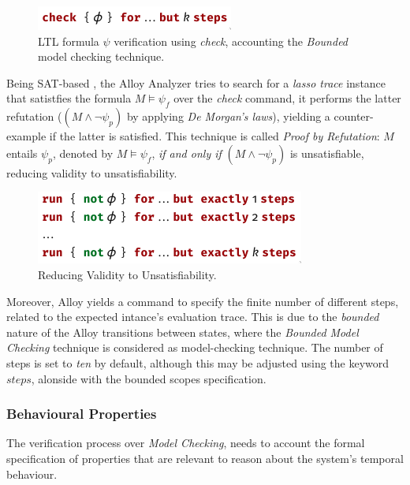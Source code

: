 \begin{figure}[H]
    \centering
    \includegraphics[width=0.4\linewidth]{images/check_alloy_1.png}
    \caption{LTL formula $\psi$ verification using \textit{check}, accounting the \textit{Bounded} model checking technique.}
    \label{fig:alloy-check-1}
\end{figure}

Being SAT-based \cite{lwspecification}, the Alloy Analyzer tries to search for a \textit{lasso trace} instance that satistfies the formula $M \models \psi_{f}$ over the \textit{check} command, it performs the latter refutation ($(M \wedge \neg \psi_{p})$ by applying \textit{De Morgan's laws}), yielding a counter-example if the latter is satisfied. This technique is called \textit{Proof by Refutation}: $M$ entails $\psi_{p}$, denoted by $M \models \psi_{f}$, \textit{if and only if} $(M \wedge \neg \psi_{p})$ is unsatisfiable, reducing validity to unsatisfiability.

\begin{figure}[H]
    \centering
    \includegraphics[width=0.5\linewidth]{images/check_alloy_2.png}
    \caption{Reducing Validity to Unsatisfiability.}
    \label{fig:alloy-check-2}
\end{figure}

Moreover, Alloy yields a command to specify the finite number of different steps, related to the expected intance's evaluation trace. This is due to the \textit{bounded} nature of the Alloy transitions between states, where the \textit{Bounded Model Checking} technique is considered as model-checking technique. The number of steps is set to \textit{ten} by default, although this may be adjusted using the keyword $steps$, alonside with the bounded scopes specification. 

\subsubsection{Behavioural Properties}

The verification process over \textit{Model Checking}, needs to account the formal specification of properties that are relevant to reason about the system's temporal behaviour. \cite{baier2008principles} 

